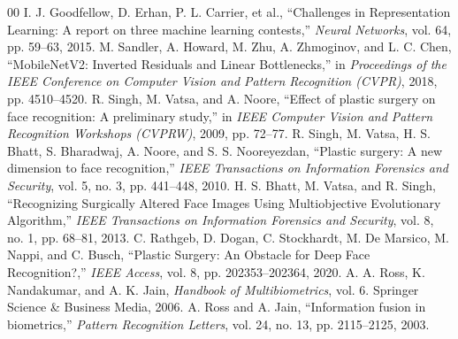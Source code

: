 \documentclass{article} %
\begin{document}
\begin{thebibliography}{00}
 I. J. Goodfellow, D. Erhan, P. L. Carrier, et al., ``Challenges in Representation Learning: A report on three machine learning contests,'' \textit{Neural Networks}, vol. 64, pp. 59--63, 2015.
 M. Sandler, A. Howard, M. Zhu, A. Zhmoginov, and L. C. Chen, ``MobileNetV2: Inverted Residuals and Linear Bottlenecks,'' in \textit{Proceedings of the IEEE Conference on Computer Vision and Pattern Recognition (CVPR)}, 2018, pp. 4510--4520.
 R. Singh, M. Vatsa, and A. Noore, ``Effect of plastic surgery on face recognition: A preliminary study,'' in \textit{IEEE Computer Vision and Pattern Recognition Workshops (CVPRW)}, 2009, pp. 72--77.
 R. Singh, M. Vatsa, H. S. Bhatt, S. Bharadwaj, A. Noore, and S. S. Nooreyezdan, ``Plastic surgery: A new dimension to face recognition,'' \textit{IEEE Transactions on Information Forensics and Security}, vol. 5, no. 3, pp. 441--448, 2010.
 H. S. Bhatt, M. Vatsa, and R. Singh, ``Recognizing Surgically Altered Face Images Using Multiobjective Evolutionary Algorithm,'' \textit{IEEE Transactions on Information Forensics and Security}, vol. 8, no. 1, pp. 68--81, 2013.
 C. Rathgeb, D. Dogan, C. Stockhardt, M. De Marsico, M. Nappi, and C. Busch, ``Plastic Surgery: An Obstacle for Deep Face Recognition?,'' \textit{IEEE Access}, vol. 8, pp. 202353--202364, 2020.
 A. A. Ross, K. Nandakumar, and A. K. Jain, \textit{Handbook of Multibiometrics}, vol. 6. Springer Science \& Business Media, 2006.
 A. Ross and A. Jain, ``Information fusion in biometrics,'' \textit{Pattern Recognition Letters}, vol. 24, no. 13, pp. 2115--2125, 2003.
\end{thebibliography}

\newpage

\end{document}
